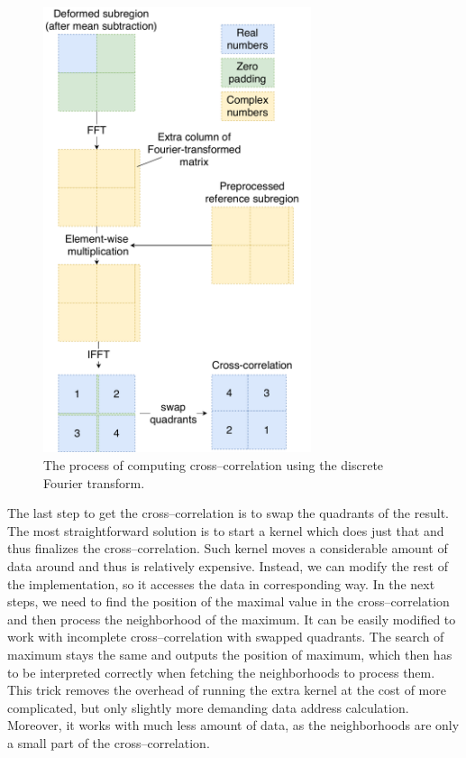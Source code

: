 \begin{figure}
	\centering
	\includegraphics[width=0.7\textwidth]{img/fft-impl}
	\caption{The process of computing cross--correlation using the discrete Fourier transform.}
	\label{fft-impl}
\end{figure}

The last step to get the cross--correlation is to swap the quadrants of the result. The most straightforward solution is to start a kernel which does just that and thus finalizes the cross--correlation. Such kernel moves a considerable amount of data around and thus is relatively expensive. Instead, we can modify the rest of the implementation, so it accesses the data in corresponding way. In the next steps, we need to find the position of the maximal value in the cross--correlation and then process the neighborhood of the maximum. It can be easily modified to work with incomplete cross--correlation with swapped quadrants. The search of maximum stays the same and outputs the position of maximum, which then has to be interpreted correctly when fetching the neighborhoods to process them. This trick removes the overhead of running the extra kernel at the cost of more complicated, but only slightly more demanding data address calculation. Moreover, it works with much less amount of data, as the neighborhoods are only a small part of the cross--correlation.

